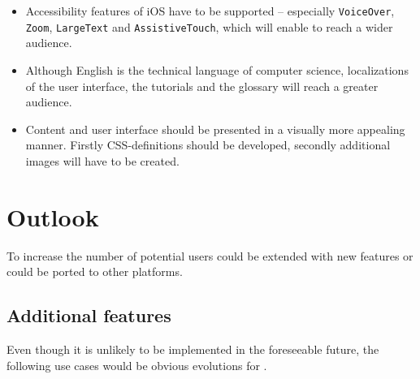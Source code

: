 \begin{itemize}

\item Accessibility features of iOS have to be supported – especially 
\verb+VoiceOver+, \verb+Zoom+, \verb+LargeText+ and \verb+AssistiveTouch+,
which will enable \Nyaya to reach a wider audience.

\item Although English is the technical language of computer science,
localizations of the user interface, the tutorials and the glossary will reach a greater audience.
%
%


\item Content and user interface should be presented in a visually more appealing manner.
Firstly CSS-definitions should be developed, secondly additional images will have to be created.

\end{itemize}
%
%
%
%
%

\section{Outlook}

To increase the number of potential users
\Nyaya could be extended with new features
or \Nyaya could be ported to other platforms.

\subsection{Additional features}

Even though it is unlikely to be implemented in the foreseeable future, 
the following use cases would be obvious evolutions for \Nyaya.

